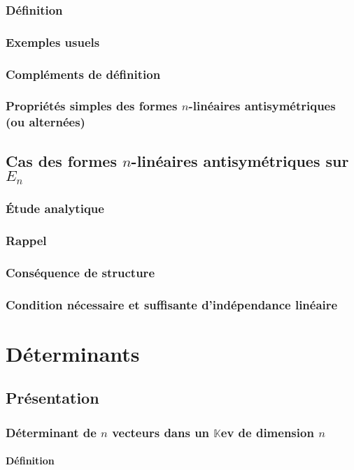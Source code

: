 \documentclass[12pt,a4paper,french]{book}
\begin{document}
		\subsection{Définition}
		\subsection{Exemples usuels}
		\subsection{Compléments de définition}
		\subsection{Propriétés simples des formes $n$-linéaires antisymétriques (ou alternées)}
	\section{Cas des formes $n$-linéaires antisymétriques sur $E_n$}
		\subsection{Étude analytique}
		\subsection{Rappel}
		\subsection{Conséquence de structure}
		\subsection{Condition nécessaire et suffisante d'indépendance linéaire}

\chapter{Déterminants}
	\section{Présentation}
		\subsection{Déterminant de $n$ vecteurs dans un $\mathbb{K}$ev de dimension $n$}
			\subsubsection{Définition}
\end{document}
